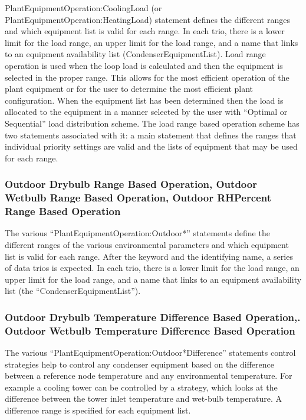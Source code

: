 PlantEquipmentOperation:CoolingLoad (or PlantEquipmentOperation:HeatingLoad) statement defines the different ranges and which equipment list is valid for each range. In each trio, there is a lower limit for the load range, an upper limit for the load range, and a name that links to an equipment availability list (CondenserEquipmentList). Load range operation is used when the loop load is calculated and then the equipment is selected in the proper range. This allows for the most efficient operation of the plant equipment or for the user to determine the most efficient plant configuration. When the equipment list has been determined then the load is allocated to the equipment in a manner selected by the user with ``Optimal or Sequential'' load distribution scheme. The load range based operation scheme has two statements associated with it: a main statement that defines the ranges that individual priority settings are valid and the lists of equipment that may be used for each range.

\subsubsection{Outdoor Drybulb Range Based Operation, Outdoor Wetbulb Range Based Operation, Outdoor RHPercent Range Based Operation}\label{outdoor-drybulb-range-based-operation-outdoor-wetbulb-range-based-operation-outdoor-rhpercent-range-based-operation-1}

The various ``PlantEquipmentOperation:Outdoor*'' statements define the different ranges of the various environmental parameters and which equipment list is valid for each range. After the keyword and the identifying name, a series of data trios is expected. In each trio, there is a lower limit for the load range, an upper limit for the load range, and a name that links to an equipment availability list (the ``CondenserEquipmentList'').

\subsubsection{Outdoor Drybulb Temperature Difference Based Operation,. Outdoor Wetbulb Temperature Difference Based Operation}\label{outdoor-drybulb-temperature-difference-based-operation.-outdoor-wetbulb-temperature-difference-based-operation}

The various ``PlantEquipmentOperation:Outdoor*Difference'' statements control strategies help to control any condenser equipment based on the difference between a reference node temperature and any environmental temperature. For example a cooling tower can be controlled by a strategy, which looks at the difference between the tower inlet temperature and wet-bulb temperature. A difference range is specified for each equipment list.

